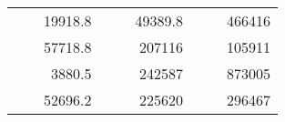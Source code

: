 \begin{table}[]
\begin{tabular}{|ccrccrccc}
\rowcolor[HTML]{DDFDFF} 
\multicolumn{1}{|c|}{\cellcolor[HTML]{FFFFC7}}                                & \multicolumn{1}{c|}{\cellcolor[HTML]{DDFDFF}}                      & \multicolumn{1}{r|}{\cellcolor[HTML]{DAE8FC}19918.8}   & \multicolumn{1}{c|}{\cellcolor[HTML]{FFFFC7}}                                & \multicolumn{1}{c|}{\cellcolor[HTML]{DDFDFF}}                       & \multicolumn{1}{r|}{\cellcolor[HTML]{DDFDFF}49389.8}   & \multicolumn{1}{c|}{\cellcolor[HTML]{FFFFC7}}                                & \multicolumn{1}{c|}{\cellcolor[HTML]{DDFDFF}}                      & \multicolumn{1}{r|}{\cellcolor[HTML]{DDFDFF}466416}    \\ \cline{3-3} \cline{6-6} \cline{9-9} 
\multicolumn{1}{|c|}{\cellcolor[HTML]{FFFFC7}}                                & \multicolumn{1}{c|}{\cellcolor[HTML]{DDFDFF}}                      & \multicolumn{1}{r|}{\cellcolor[HTML]{DDFDFF}57718.8}   & \multicolumn{1}{c|}{\cellcolor[HTML]{FFFFC7}}                                & \multicolumn{1}{c|}{\cellcolor[HTML]{DDFDFF}}                       & \multicolumn{1}{r|}{\cellcolor[HTML]{DAE8FC}207116}    & \multicolumn{1}{c|}{\cellcolor[HTML]{FFFFC7}}                                & \multicolumn{1}{c|}{\cellcolor[HTML]{DDFDFF}}                      & \multicolumn{1}{r|}{\cellcolor[HTML]{DAE8FC}105911}    \\ \cline{3-3} \cline{6-6} \cline{9-9} 
\rowcolor[HTML]{DDFDFF} 
\multicolumn{1}{|c|}{\cellcolor[HTML]{FFFFC7}}                                & \multicolumn{1}{c|}{\cellcolor[HTML]{DDFDFF}}                      & \multicolumn{1}{r|}{\cellcolor[HTML]{DAE8FC}3880.5}    & \multicolumn{1}{c|}{\cellcolor[HTML]{FFFFC7}}                                & \multicolumn{1}{c|}{\cellcolor[HTML]{DDFDFF}}                       & \multicolumn{1}{r|}{\cellcolor[HTML]{DDFDFF}242587}    & \multicolumn{1}{c|}{\cellcolor[HTML]{FFFFC7}}                                & \multicolumn{1}{c|}{\cellcolor[HTML]{DDFDFF}}                      & \multicolumn{1}{r|}{\cellcolor[HTML]{DDFDFF}873005}    \\ \cline{3-3} \cline{6-6} \cline{9-9} 
\multicolumn{1}{|c|}{\cellcolor[HTML]{FFFFC7}}                                & \multicolumn{1}{c|}{\cellcolor[HTML]{DDFDFF}}                      & \multicolumn{1}{r|}{\cellcolor[HTML]{DDFDFF}52696.2}   & \multicolumn{1}{c|}{\cellcolor[HTML]{FFFFC7}}                                & \multicolumn{1}{c|}{\cellcolor[HTML]{DDFDFF}}                       & \multicolumn{1}{r|}{\cellcolor[HTML]{DAE8FC}225620}    & \multicolumn{1}{c|}{\cellcolor[HTML]{FFFFC7}}                                & \multicolumn{1}{c|}{\cellcolor[HTML]{DDFDFF}}                      & \multicolumn{1}{r|}{\cellcolor[HTML]{DAE8FC}296467}    \\ \cline{3-3} \cline{6-6} \cline{9-9} 

\end{tabular}
\end{table}
